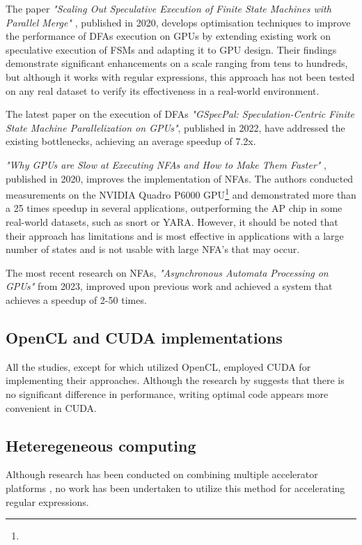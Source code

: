 \documentclass[10pt,onecolumn,twoside,english,a4paper]{article}
\begin{document}
The paper \textit{"Scaling Out Speculative Execution of Finite State Machines with Parallel Merge"} \cite{Xia:FSA-scaling}, published in 2020, develops optimisation techniques to improve the performance of DFAs execution on GPUs by extending existing work on speculative execution of FSMs and adapting it to GPU design. Their findings demonstrate significant enhancements on a scale ranging from tens to hundreds, but although it works with regular expressions, this approach has not been tested on any real dataset to verify its effectiveness in a real-world environment.

The latest paper on the execution of DFAs \textit{"GSpecPal: Speculation-Centric Finite State Machine Parallelization on GPUs"}\cite{wang2022gspecpal}, published in 2022, have addressed the existing bottlenecks, achieving an average speedup of 7.2x.

\textit{"Why GPUs are Slow at Executing NFAs and How to Make Them Faster"} \cite{Liu:WhyGPUSlowNFA}, published in 2020, improves the implementation of NFAs. The authors conducted measurements on the NVIDIA Quadro P6000 GPU\footnote{} and demonstrated more than a 25 times speedup in several applications, outperforming the AP chip in some real-world datasets, such as snort or YARA. However, it should be noted that their approach has limitations and is most effective in applications with a large number of states and is not usable with large NFA's that may occur.

The most recent research on NFAs, \textit{"Asynchronous Automata Processing on GPUs"}\cite{Liu:Asynchronous} from 2023, improved upon previous work and achieved a system that achieves a speedup of 2-50 times.

\subsection{OpenCL and CUDA implementations} \label{OpenCL and CUDA implementations}
All the studies, except for \cite{rosciszewski2014regular} which utilized OpenCL, employed CUDA for implementing their approaches. Although the research by \cite{Fang:Comparison-cuda-opencl} suggests that there is no significant difference in performance, writing optimal code appears more convenient in CUDA.

\subsection{Heteregeneous computing} \label{Heteregeneous computing}
Although research has been conducted on combining multiple accelerator platforms \cite{kobayashi2019gpu}, no work has been undertaken to utilize this method for accelerating regular expressions.
\end{document}
